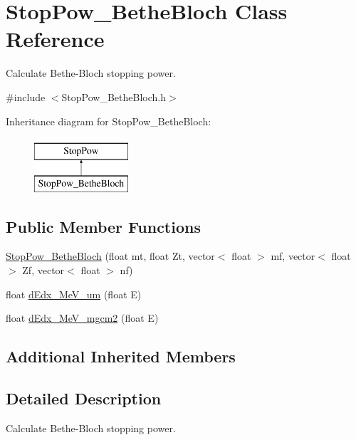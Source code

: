 \hypertarget{class_stop_pow___bethe_bloch}{\section{Stop\-Pow\-\_\-\-Bethe\-Bloch Class Reference}
\label{class_stop_pow___bethe_bloch}
}


Calculate Bethe-\/\-Bloch stopping power.  




{\ttfamily \#include $<$Stop\-Pow\-\_\-\-Bethe\-Bloch.\-h$>$}

Inheritance diagram for Stop\-Pow\-\_\-\-Bethe\-Bloch\-:\begin{figure}[H]
\begin{center}
\leavevmode
\includegraphics[height=2.000000cm]{class_stop_pow___bethe_bloch}
\end{center}
\end{figure}
\subsection*{Public Member Functions}
\begin{DoxyCompactItemize}
\item 
\hyperlink{class_stop_pow___bethe_bloch_a7bdf76d6025ae712bda6640432aed6a0}{Stop\-Pow\-\_\-\-Bethe\-Bloch} (float mt, float Zt, vector$<$ float $>$ mf, vector$<$ float $>$ Zf, vector$<$ float $>$ nf)
\item 
float \hyperlink{class_stop_pow___bethe_bloch_a1c8325609c30e33533cb4716592bce67}{d\-Edx\-\_\-\-Me\-V\-\_\-um} (float E)
\item 
float \hyperlink{class_stop_pow___bethe_bloch_aacfafefd60f0cc59f6513283c62f24f5}{d\-Edx\-\_\-\-Me\-V\-\_\-mgcm2} (float E)
\end{DoxyCompactItemize}
\subsection*{Additional Inherited Members}


\subsection{Detailed Description}
Calculate Bethe-\/\-Bloch stopping power. 

